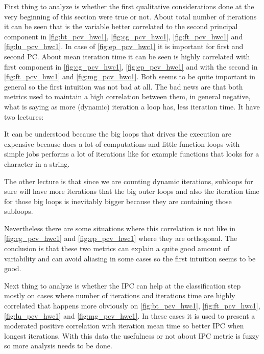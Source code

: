 First thing to analyze is whether the first qualitative considerations done at
the very beginning of this section were true or not. About total number of
iterations it can be seen that is the variable better correlated to the 
second principal component in \ref{fig:bt_pcv_hwc1}, \ref{fig:cg_pcv_hwc1},
\ref{fig:ft_pcv_hwc1} and \ref{fig:lu_pcv_hwc1}. In case of
\ref{fig:ep_pcv_hwc1} it is important for first and second PC. About mean 
iteration time it can be seen is highly correlated with first component in
\ref{fig:cg_pcv_hwc1}, \ref{fig:ep_pcv_hwc1} and with the second in
\ref{fig:ft_pcv_hwc1} and \ref{fig:mg_pcv_hwc1}. Both seems to be quite
important in general so the first intuition was not bad at all. The bad news are
that both metrics used to maintain a high correlation between them, in general
negative, what is saying as more (dynamic) iteration a loop has, less iteration
time. It have two lectures:
\begin{enumerate*}[label=\roman*)]
  \item It can be understood because the big loops that drives the execution are
    expensive because does a lot of computations and little function loops with
    simple jobs performs a lot of iterations like for example functions that
    looks for a character in a string.
  \item The other lecture is that since we are counting dynamic iterations,
    subloops for sure will have more iterations that the big outer loops and
    also the iteration time for those big loops is inevitably bigger because
    they are containing those subloops.
\end{enumerate*}
Nevertheless there are some situations where this correlation is not like in
\ref{fig:cg_pcv_hwc1} and \ref{fig:ep_pcv_hwc1}  where they are orthogonal. The
conclusion is that these two metrics can explain a quite good amount of
variability and can avoid aliasing in some cases so the first intuition seems to
be good.

Next thing to analyze is whether the IPC can help at the
classification step mostly on cases where number of iterations and iterations
time are highly correlated that happens more obviously on \ref{fig:bt_pcv_hwc1},
\ref{fig:ft_pcv_hwc1}, \ref{fig:lu_pcv_hwc1} and \ref{fig:mg_pcv_hwc1}. In these
cases it is used to present a moderated positive correlation with iteration mean
time so better IPC when longest iterations. With this data the usefulness or not
about IPC metric is fuzzy so more analysis needs to be done.

